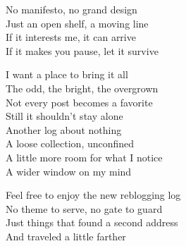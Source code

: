 \begin{lyrics}

No manifesto, no grand design\\
Just an open shelf, a moving line\\
If it interests me, it can arrive\\
If it makes you pause, let it survive

I want a place to bring it all\\
The odd, the bright, the overgrown\\
Not every post becomes a favorite\\
Still it shouldn’t stay alone\\
Another log about nothing\\
A loose collection, unconfined\\
A little more room for what I notice\\
A wider window on my mind

Feel free to enjoy the new reblogging log\\
No theme to serve, no gate to guard\\
Just things that found a second address\\
And traveled a little farther
\end{lyrics}

